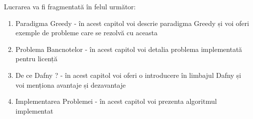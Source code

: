 Lucrarea va fi fragmentată în felul următor: 
\begin{enumerate}
	\item Paradigma Greedy - în acest capitol voi descrie paradigma Greedy și voi oferi exemple de probleme care se rezolvă cu aceasta
	\item Problema Bancnotelor - în acest capitol voi detalia problema implementată pentru licență
	\item De ce Dafny ?  - în acest capitol voi oferi o introducere în limbajul Dafny și voi menționa avantaje și dezavantaje 
	\item Implementarea Problemei - în acest capitol voi prezenta algoritmul implementat
\end{enumerate}
